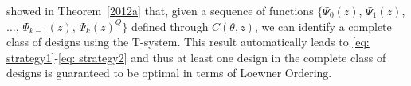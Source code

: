 \documentclass[12pt]{amsart}
\theoremstyle{definition}
\theoremstyle{remark}
\numberwithin{equation}{section}
\begin{document}
      
\cite{yang2012} showed in Theorem~\ref{2012a} that, given a sequence of functions $\{\Psi_0(z)$, $\Psi_1(z)$, $\ldots$, $\Psi_{k-1}(z)$, $\Psi_k(z)^Q\}$ defined through $C(\theta,z)$, we can identify a complete class of designs using the T-system. This result automatically leads to \eqref{eq: strategy1}-\eqref{eq: strategy2} and thus at least one design in the complete class of designs is guaranteed to be optimal in terms of Loewner Ordering.
\end{document}
